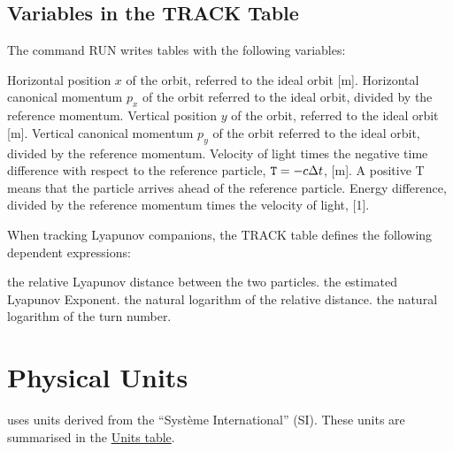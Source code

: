 \subsection{Variables in the TRACK Table}
\label{subsec:tables_track}
The command RUN writes tables with the following variables: 
\begin{madlist}
   Horizontal position $x$ of the orbit, referred to the
  ideal orbit [m].    
   Horizontal canonical momentum $p_x$ of the orbit
  referred to the ideal orbit, divided by the reference momentum.    
   Vertical position $y$ of the orbit, referred to the
  ideal orbit [m].    
   Vertical canonical momentum $p_y$ of the orbit
  referred to the ideal orbit, divided by the reference momentum.    
   Velocity of light times the negative time difference with
  respect to the reference particle, $\hbox{\tt T}=-c\Delta t$, [m]. 
  A positive T means that the particle arrives ahead of the reference
  particle.    
   Energy difference, divided by the reference momentum times
  the velocity of light, [1].    
\end{madlist} 

When tracking Lyapunov companions, the TRACK table defines the following
dependent expressions:  
\begin{madlist}
   the relative Lyapunov distance between the two particles.    
   the estimated Lyapunov Exponent.   
   the natural logarithm of the relative distance.   
   the natural logarithm of the turn number.   
\end{madlist}





\section{Physical Units}
\label{sec:units}
\madx uses units derived from the ``Syst\`eme
International'' (SI). These units are summarised in the
\hyperlink{table}{Units table}.  

